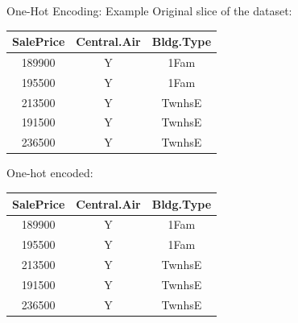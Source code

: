 \begin{vbframe}{One-Hot Encoding: Example}
  Original slice of the dataset:
  \vspace{+.4cm}
  \footnotesize
  
  \begin{center}
    \begin{tabular}{c|c|c}
      \hline
      SalePrice & Central.Air & Bldg.Type \\
      \hline
      189900    & Y           & 1Fam      \\
      \hline
      195500    & Y           & 1Fam      \\
      \hline
      213500    & Y           & TwnhsE    \\
      \hline
      191500    & Y           & TwnhsE    \\
      \hline
      236500    & Y           & TwnhsE    \\
      \hline
    \end{tabular}
  \end{center}
  
  
  \normalsize{One-hot encoded:}
  \vspace{+.4cm}
  
  \scriptsize
  \begin{center}
    \begin{tabular}{c|c|c}
      \hline
      SalePrice & Central.Air & Bldg.Type \\
      \hline
      189900    & Y           & 1Fam      \\
      \hline
      195500    & Y           & 1Fam      \\
      \hline
      213500    & Y           & TwnhsE    \\
      \hline
      191500    & Y           & TwnhsE    \\
      \hline
      236500    & Y           & TwnhsE    \\
      \hline
    \end{tabular}
  \end{center}
  
\end{vbframe}

